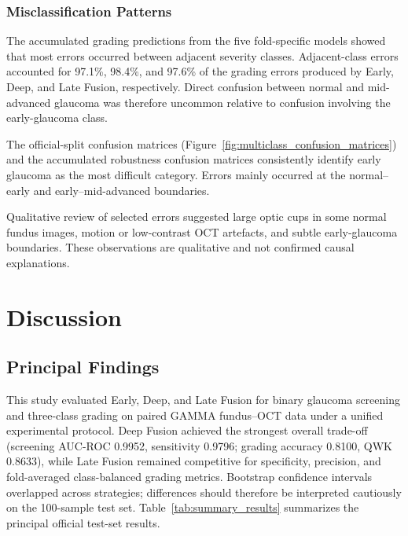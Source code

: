 \documentclass[sn-mathphys]{sn-jnl}%
\theoremstyle{thmstyleone}%
\theoremstyle{thmstyletwo}%
\theoremstyle{thmstylethree}%
\begin{document}
\subsubsection{Misclassification Patterns}
\label{subsubsec:misclassification_results}

The accumulated grading predictions from the five fold-specific models showed that most errors occurred between adjacent severity classes. Adjacent-class errors accounted for 97.1\%, 98.4\%, and 97.6\% of the grading errors produced by Early, Deep, and Late Fusion, respectively. Direct confusion between normal and mid-advanced glaucoma was therefore uncommon relative to confusion involving the early-glaucoma class.

The official-split confusion matrices (Figure~\ref{fig:multiclass_confusion_matrices}) and the accumulated robustness confusion matrices consistently identify early glaucoma as the most difficult category. Errors mainly occurred at the normal--early and early--mid-advanced boundaries.

Qualitative review of selected errors suggested large optic cups in some normal fundus images, motion or low-contrast OCT artefacts, and subtle early-glaucoma boundaries. These observations are qualitative and not confirmed causal explanations.
\section{Discussion}
\label{sec:discussion}

\subsection{Principal Findings}
\label{subsec:principal_findings}

This study evaluated Early, Deep, and Late Fusion for binary glaucoma screening and three-class grading on paired GAMMA fundus--OCT data under a unified experimental protocol. Deep Fusion achieved the strongest overall trade-off (screening AUC-ROC 0.9952, sensitivity 0.9796; grading accuracy 0.8100, QWK 0.8633), while Late Fusion remained competitive for specificity, precision, and fold-averaged class-balanced grading metrics. Bootstrap confidence intervals overlapped across strategies; differences should therefore be interpreted cautiously on the 100-sample test set. Table~\ref{tab:summary_results} summarizes the principal official test-set results.
\end{document}
